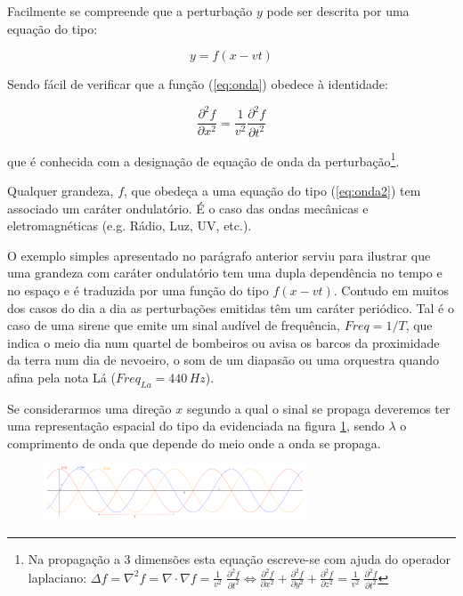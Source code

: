 \documentclass[a4paper,12pt]{article}      %
\begin{document}
Facilmente se compreende que a perturbação $y$ pode ser descrita por uma equação do tipo:

\begin{equation}
	\label{eq:onda}
y=f(x- vt)	
\end{equation}

Sendo fácil de verificar que a função (\ref{eq:onda}) obedece à identidade:

\begin{equation}
	\label{eq:onda2}
	\frac{\partial^2 f}{\partial x^2} = \frac{1}{v^2}  \frac{\partial^2 f}{\partial t^2} 
\end{equation}

que é conhecida com a designação de equação de onda da perturbação\footnote{Na propagação a 3 dimensões esta equação escreve-se com ajuda do operador laplaciano:
 $\Delta f = \nabla^2 f = \nabla \cdot \nabla f = \frac{1}{v^2} \;  \frac{\partial^2 f}{\partial t^2} 
\Leftrightarrow  \frac{\partial^2 f}{\partial x^2} +  \frac{\partial^2 f}{\partial y^2} +  \frac{\partial^2 f}{\partial z^2} =  
\frac{1}{v^2} \;  \frac{\partial^2 f}{\partial t^2} $}. 

Qualquer grandeza, $f$, que obedeça a uma equação do tipo (\ref{eq:onda2}) tem associado um caráter ondulatório. É o caso das ondas mecânicas e eletromagnéticas (e.g. Rádio, Luz, UV, etc.).

O exemplo simples apresentado no parágrafo anterior serviu para ilustrar que uma grandeza com caráter ondulatório tem uma dupla dependência no tempo e no espaço e é traduzida por uma função do tipo $f(x-vt)$. Contudo em muitos dos casos do dia a dia as perturbações emitidas têm um caráter periódico. Tal é o caso de uma sirene que  emite um sinal audível de frequência, $Freq = 1/T$, que indica o meio dia num quartel de bombeiros ou avisa os barcos da proximidade da terra num dia de nevoeiro, o som de um diapasão ou  uma orquestra quando afina pela nota Lá ($Freq_{La} = 440\, Hz$). 

Se considerarmos uma direção $x$ segundo a qual o sinal se propaga deveremos ter uma representação espacial do tipo da evidenciada na figura \ref{fig:propag_esp}, sendo $\lambda$ o comprimento de onda que depende do meio onde a onda se propaga.


\begin{figure} [!htbp] 
	\centering 
	\includegraphics[width=0.7\textwidth]{propag_esp} 
	\caption{\label{fig:propag_esp}} 
\end{figure}
\end{document}
